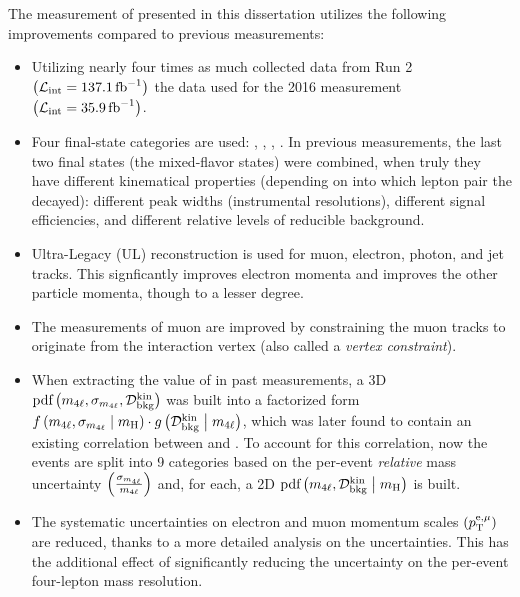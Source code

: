 The measurement of \mH presented in this dissertation utilizes the following improvements compared to previous measurements:
\begin{itemize}
    \item Utilizing nearly four times as much collected data from Run 2 $\left( \mathcal{L}_\text{int} = 137.1\,\text{fb}^{\text{$-$}1} \right)$ \vs the data used for the 2016 measurement $\left( \mathcal{L}_\text{int} = 35.9\,\text{fb}^{\text{$-$}1} \right)$.
    \item Four final-state categories are used: \fourmu, \foure, \twoetwomu, \twomutwoe.
    In previous measurements, the last two final states (the mixed-flavor states) were combined, when truly they have different kinematical properties (depending on into which lepton pair the \Zone decayed):
    different peak widths (instrumental resolutions), different signal efficiencies, and different relative levels of reducible background.
    \item Ultra-Legacy (UL) reconstruction is used for muon, electron, photon, and jet tracks.
    This signficantly improves electron momenta and improves the other particle momenta, though to a lesser degree.
    \item The measurements of muon \pt are improved by constraining the muon tracks to originate from the interaction vertex (also called a \emph{vertex constraint}).
    \item When extracting the value of \mH in past measurements, a 3D $\text{pdf} \left( m_{4\ell}, \sigma_{m_{4\ell}}, \mathcal{D}^{\text{kin}}_{\text{bkg}} \right)$ was built into a factorized form
    $f \left( m_{4\ell}, \sigma_{m_{4\ell}} \; \middle| \;{} m_{\mathrm{H}} \right)   \cdot   g\left( \mathcal{D}^{\text{kin}}_{\text{bkg}} \; \middle| \;{} m_{4\ell} \right)$,
    which was later found to contain an existing correlation between \mfourlerr and \Dkinbkg.
    To account for this correlation, now the events are split into 9 categories based on the per-event \emph{relative} mass uncertainty $\left( \frac{\sigma_{m_{4\ell}}}{m_{4\ell}} \right)$ and, for each, a 2D $\text{pdf} \left( m_{4\ell}, \mathcal{D}^{\text{kin}}_{\text{bkg}} \; \middle| \;{} m_{\mathrm{H}} \right)$ is built.
    \item The systematic uncertainties on electron and muon momentum scales $\left( p_{\mathrm{T}}^{\mathrm{e}, \mu} \right)$ are reduced, thanks to a more detailed analysis on the uncertainties.
    This has the additional effect of significantly reducing the uncertainty on the per-event four-lepton mass resolution.
\end{itemize}

